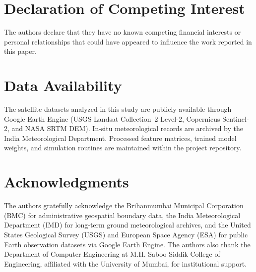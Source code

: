 \documentclass[a4paper,fleqn]{cas-sc}
\begin{document}
\printcredits

\section*{Declaration of Competing Interest}
The authors declare that they have no known competing financial interests or personal relationships that could have appeared to influence the work reported in this paper.

\section*{Data Availability}
The satellite datasets analyzed in this study are publicly available through Google Earth Engine (USGS Landsat Collection~2 Level-2, Copernicus Sentinel-2, and NASA SRTM DEM). In-situ meteorological records are archived by the India Meteorological Department. Processed feature matrices, trained model weights, and simulation routines are maintained within the project repository.

\section*{Acknowledgments}
The authors gratefully acknowledge the Brihanmumbai Municipal Corporation (BMC) for administrative geospatial boundary data, the India Meteorological Department (IMD) for long-term ground meteorological archives, and the United States Geological Survey (USGS) and European Space Agency (ESA) for public Earth observation datasets via Google Earth Engine. The authors also thank the Department of Computer Engineering at M.H. Saboo Siddik College of Engineering, affiliated with the University of Mumbai, for institutional support.
\end{document}
